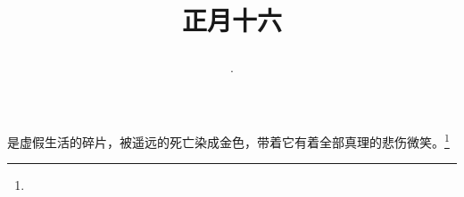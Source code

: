 \title{\date[d=25,m=2,y=2024][year:cn-y,年,month:cn,day:cn,日,·,weekday]·正月十六 }
是虚假生活的碎片，被遥远的死亡染成金色，带着它有着全部真理的悲伤微笑。\footnote{ }

